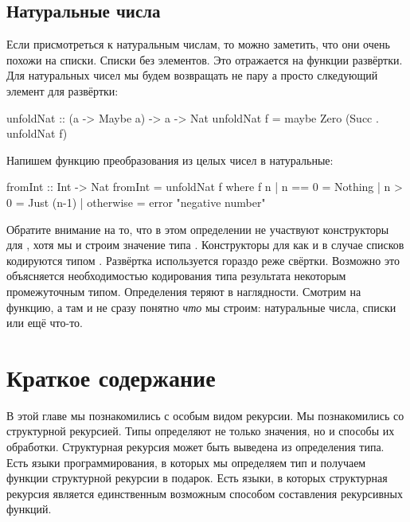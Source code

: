 
\subsection{Натуральные числа}

Если присмотреться к натуральным числам, то можно
заметить, что они очень похожи на списки. Списки без элементов.
Это отражается на функции развёртки. Для натуральных
чисел мы будем возвращать не пару а просто слкедующий
элемент для развёртки:

\begin{code}
unfoldNat :: (a -> Maybe a) -> a -> Nat
unfoldNat f = maybe Zero (Succ . unfoldNat f)
\end{code}

Напишем функцию преобразования из целых чисел в натуральные:


\begin{code}
fromInt :: Int -> Nat
fromInt = unfoldNat f
    where f n
            | n == 0    = Nothing
            | n >  0    = Just (n-1)
            | otherwise = error "negative number"
\end{code}

Обратите внимание на то, что в этом определении не
участвуют конструкторы для , хотя мы и строим
значение типа . Конструкторы для  
как и в случае списков кодируются типом .
Развёртка используется гораздо реже свёртки. 
Возможно это объясняется необходимостью кодирования 
типа результата некоторым промежуточным типом. 
Определения теряют в наглядности. Смотрим на функцию,
а там  и не сразу понятно \emph{что} мы строим:
натуральные числа, списки или ещё что-то.

\section{Краткое содержание}

В этой главе мы познакомились с особым видом рекурсии. 
Мы познакомились со структурной рекурсией. Типы определяют
не только значения, но и способы их обработки. Структурная
рекурсия может быть выведена из определения типа. 
Есть языки программирования, в которых мы определяем тип 
и получаем функции структурной рекурсии в подарок. 
Есть языки, в которых структурная рекурсия является единственным
возможным способом составления рекурсивных функций. 

